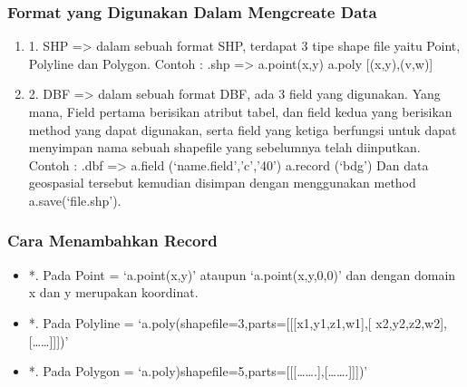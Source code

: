 \subsubsection{Format yang Digunakan Dalam Mengcreate Data}
\begin{enumerate}
     \item 1. SHP => dalam sebuah format SHP, terdapat 3 tipe shape file yaitu Point, Polyline dan Polygon.
                     Contoh :     .shp => a.point(x,y)
                      a.poly [(x,y),(v,w)]
     \item 2. DBF => dalam sebuah format DBF, ada 3 field yang digunakan. Yang mana, Field pertama  berisikan   atribut    tabel, dan                        field kedua yang berisikan method yang dapat digunakan, serta field yang ketiga berfungsi untuk dapat menyimpan                          nama sebuah shapefile yang sebelumnya telah diinputkan.
                     Contoh :  .dbf => a.field (‘name.field’,’c’,’40’)
                                     a.record (‘bdg’)
                     Dan data geospasial tersebut kemudian disimpan dengan menggunakan method a.save(‘file.shp’).
\end{enumerate}

\subsubsection{Cara Menambahkan Record}
\begin{itemize}
    \item *. Pada Point = ‘a.point(x,y)’ ataupun ‘a.point(x,y,0,0)’ dan dengan domain x dan y merupakan koordinat.
    \item *. Pada Polyline = ‘a.poly(shapefile=3,parts=[[[x1,y1,z1,w1],[ x2,y2,z2,w2],[……]]])’
    \item *. Pada Polygon = ‘a.poly)shapefile=5,parts=[[[…….],[…….]]])’
\end{itemize}

